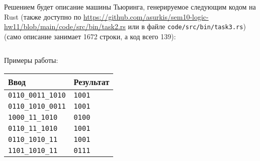 Решением будет описание машины Тьюринга,
генерируемое следующим кодом на Rust
(также доступно по
\url{https://github.com/asurkis/sem10-logic-hw11/blob/main/code/src/bin/task2.rs}
или в файле \texttt{code/src/bin/task3.rs})
(само описание занимает 1672 строки, а код всего 139):
\inputminted{rust}{code/src/bin/task3.rs}

Примеры работы:

\begin{tabular}{ll}
    Ввод & Результат \\ \hline
    \texttt{0110\_0011\_1010} & \texttt{1001} \\
    \texttt{0110\_1010\_0011} & \texttt{1001} \\
    \texttt{1000\_11\_1010} & \texttt{0100} \\
    \texttt{0110\_11\_1010} & \texttt{1001} \\
    \texttt{0110\_1010\_11} & \texttt{1001} \\
    \texttt{1101\_1010\_11} & \texttt{0111} \\
\end{tabular}
